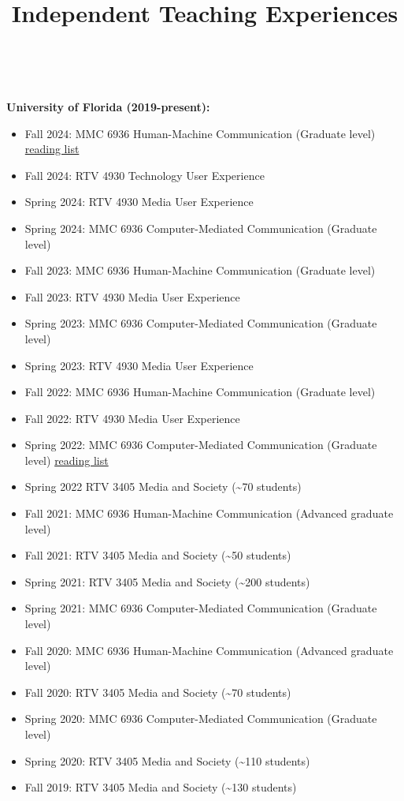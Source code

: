 \documentclass[]{article}
\title{Independent Teaching Experiences}
\author{}
\date{\vspace{-2.5em}}
\providecommand{\tightlist}{%
  \setlength{\itemsep}{0pt}\setlength{\parskip}{0pt}}
\begin{document}
\maketitle

~ ~

\textbf{University of Florida (2019-present):}

\begin{itemize}
\tightlist
\item
  Fall 2024: MMC 6936 Human-Machine Communication (Graduate level)
  \href{Files/HMC\%20reading\%20list\%202024.pdf}{reading list}
\item
  Fall 2024: RTV 4930 Technology User Experience
\item
  Spring 2024: RTV 4930 Media User Experience
\item
  Spring 2024: MMC 6936 Computer-Mediated Communication (Graduate level)
\item
  Fall 2023: MMC 6936 Human-Machine Communication (Graduate level)
\item
  Fall 2023: RTV 4930 Media User Experience
\item
  Spring 2023: MMC 6936 Computer-Mediated Communication (Graduate level)
\item
  Spring 2023: RTV 4930 Media User Experience
\item
  Fall 2022: MMC 6936 Human-Machine Communication (Graduate level)
\item
  Fall 2022: RTV 4930 Media User Experience
\item
  Spring 2022: MMC 6936 Computer-Mediated Communication (Graduate level)
  \href{Files/CMC\%20readings.pdf}{reading list}
\item
  Spring 2022 RTV 3405 Media and Society (\textasciitilde{}70 students)
\item
  Fall 2021: MMC 6936 Human-Machine Communication (Advanced graduate
  level)
\item
  Fall 2021: RTV 3405 Media and Society (\textasciitilde{}50 students)
\item
  Spring 2021: RTV 3405 Media and Society (\textasciitilde{}200
  students)
\item
  Spring 2021: MMC 6936 Computer-Mediated Communication (Graduate level)
\item
  Fall 2020: MMC 6936 Human-Machine Communication (Advanced graduate
  level)
\item
  Fall 2020: RTV 3405 Media and Society (\textasciitilde{}70 students)
\item
  Spring 2020: MMC 6936 Computer-Mediated Communication (Graduate level)
\item
  Spring 2020: RTV 3405 Media and Society (\textasciitilde{}110
  students)
\item
  Fall 2019: RTV 3405 Media and Society (\textasciitilde{}130 students)
\end{itemize}
\end{document}
